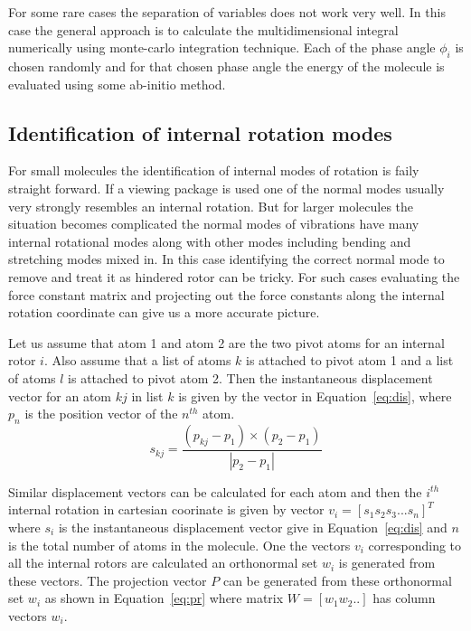 \documentclass[a4paper,12pt]{article}
\begin{document}
For some rare cases the separation of variables does not work very well. In this case the general approach is to calculate the multidimensional integral numerically using monte-carlo integration technique. Each of the phase angle $\phi_i$ is chosen randomly and for that chosen phase angle the energy of the molecule is evaluated using some ab-initio method.

\subsection{Identification of internal rotation modes}
For small molecules the identification of internal modes of rotation is faily straight forward. If a viewing package is used one of the normal modes usually very strongly resembles an internal rotation. But for larger molecules the situation becomes complicated the normal modes of vibrations have many internal rotational modes along with other modes including bending and stretching modes mixed in. In this case identifying the correct normal mode to remove and treat it as hindered rotor can be tricky. For such cases evaluating the force constant matrix and projecting out the force constants along the internal rotation coordinate can give us a more accurate picture.

Let us assume that atom 1 and atom 2 are the two pivot atoms for an internal rotor $i$. Also assume that a list of atoms $k$ is attached to pivot atom 1 and a list of atoms $l$ is attached to pivot atom 2. Then the instantaneous displacement vector for an atom $kj$ in list $k$ is given by the vector in Equation~\ref{eq:dis}, where $p_n$ is the position vector of the $n^{th}$ atom.
\begin{equation}
s_{kj} = \frac{(p_{kj}-p_1) \times (p_2-p_1)}{\left|p_2-p_1\right|}
\label{eq:dis}
\end{equation}

Similar displacement vectors can be calculated for each atom and then the $i^{th}$ internal rotation in cartesian coorinate is given by vector $v_i = [s_1 s_2 s_3 ... s_n]^T$ where $s_i$ is the instantaneous displacement vector give in Equation~\ref{eq:dis} and $n$ is the total number of atoms in the molecule. One the vectors $v_i$ corresponding to all the internal rotors are calculated an orthonormal set $w_i$ is generated from these vectors. The projection vector $P$ can be generated from these orthonormal set $w_i$ as shown in Equation~\ref{eq:pr} where matrix $W=[w_1 w_2..]$ has column vectors $w_i$.
\end{document}
